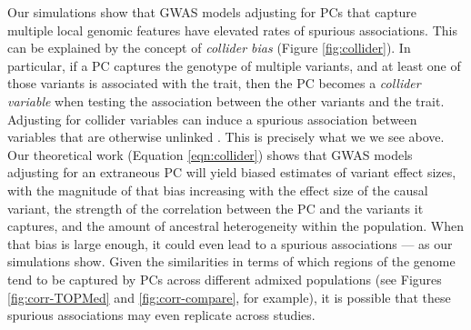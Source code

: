 \documentclass[12pt]{article}
\newcommand{\edit}[1]{{\color{red}{#1}}}
\begin{document}
Our simulations show that GWAS models adjusting for PCs that capture multiple local genomic features have elevated rates of spurious associations. %
This can be explained by the concept of \textit{collider bias} (Figure \ref{fig:collider}).
In particular, if a PC captures the genotype of multiple variants, and at least one of those variants is associated with the trait, then the PC becomes a \textit{collider variable} when testing the association between the other variants and the trait.
Adjusting for collider variables can induce a spurious association between variables that are otherwise unlinked \citep{elwert2014}.
This is precisely what we we see above.
Our theoretical work (Equation \ref{eqn:collider}) shows that GWAS models adjusting for an extraneous PC will yield biased estimates of variant effect sizes, with the magnitude of that bias increasing with the effect size of the causal variant, the strength of the correlation between the PC and the variants it captures, and the amount of ancestral heterogeneity within the population.
When that bias is large enough, it could even lead to a spurious associations --- as our simulations show.
Given the similarities in terms of which regions of the genome tend to be captured by PCs across different admixed populations (see Figures \ref{fig:corr-TOPMed} and \ref{fig:corr-compare}, for example), it is possible that these spurious associations may even replicate across studies.  
\end{document}
